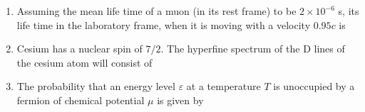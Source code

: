 \documentclass[14pt, a4paper]{extarticle}
\begin{document}
\begin{enumerate}[label=\textbf{Q. \arabic*}, start=21]
\item Assuming the mean life time of a muon (in its rest frame) to be $2\times10^{-6}$ s, its life time in the laboratory frame, when it is moving with a velocity $0.95c$ is
    \begin{enumerate}
    \end{enumerate}


\item Cesium has a nuclear spin of $7/2$. The hyperfine spectrum of the D lines of the cesium atom will consist of
\begin{enumerate}
\end{enumerate}

\item The probability that an energy level $\varepsilon$ at a temperature $T$ is unoccupied by a fermion of chemical potential $\mu$ is given by
\begin{enumerate}
\end{enumerate}


\end{enumerate}
\end{document}
